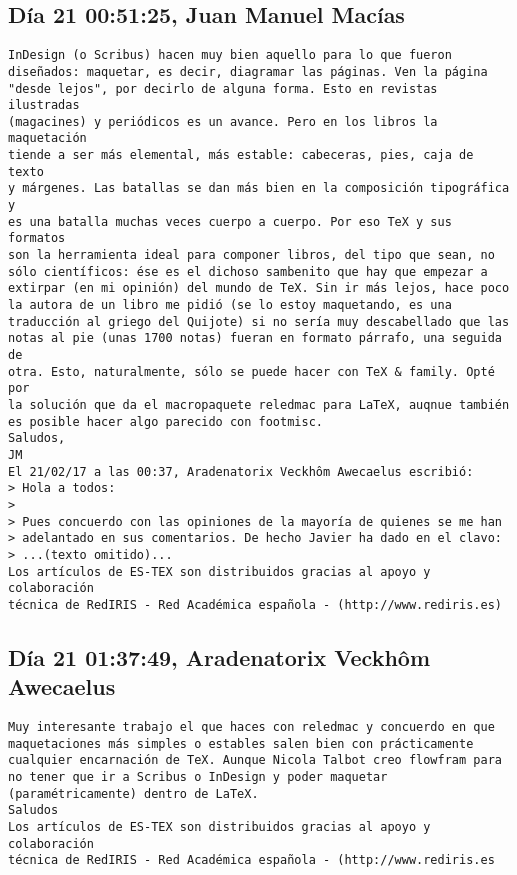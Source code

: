 \documentclass[a4paper,10pt]{article}
\begin{document}
\subsection{Día 21 00:51:25, Juan Manuel Macías}

\begin{lstlisting}
InDesign (o Scribus) hacen muy bien aquello para lo que fueron 
diseñados: maquetar, es decir, diagramar las páginas. Ven la página 
"desde lejos", por decirlo de alguna forma. Esto en revistas ilustradas 
(magacines) y periódicos es un avance. Pero en los libros la maquetación 
tiende a ser más elemental, más estable: cabeceras, pies, caja de texto 
y márgenes. Las batallas se dan más bien en la composición tipográfica y 
es una batalla muchas veces cuerpo a cuerpo. Por eso TeX y sus formatos 
son la herramienta ideal para componer libros, del tipo que sean, no 
sólo científicos: ése es el dichoso sambenito que hay que empezar a 
extirpar (en mi opinión) del mundo de TeX. Sin ir más lejos, hace poco 
la autora de un libro me pidió (se lo estoy maquetando, es una 
traducción al griego del Quijote) si no sería muy descabellado que las 
notas al pie (unas 1700 notas) fueran en formato párrafo, una seguida de 
otra. Esto, naturalmente, sólo se puede hacer con TeX & family. Opté por 
la solución que da el macropaquete reledmac para LaTeX, auqnue también 
es posible hacer algo parecido con footmisc.
Saludos,
JM
El 21/02/17 a las 00:37, Aradenatorix Veckhôm Awecaelus escribió:
> Hola a todos:
>
> Pues concuerdo con las opiniones de la mayoría de quienes se me han
> adelantado en sus comentarios. De hecho Javier ha dado en el clavo:
> ...(texto omitido)...
Los artículos de ES-TEX son distribuidos gracias al apoyo y colaboración 
técnica de RedIRIS - Red Académica española - (http://www.rediris.es)

\end{lstlisting}

\subsection{Día 21 01:37:49, Aradenatorix Veckhôm Awecaelus}

\begin{lstlisting}
Muy interesante trabajo el que haces con reledmac y concuerdo en que
maquetaciones más simples o estables salen bien con prácticamente
cualquier encarnación de TeX. Aunque Nicola Talbot creo flowfram para
no tener que ir a Scribus o InDesign y poder maquetar
(paramétricamente) dentro de LaTeX.
Saludos
Los artículos de ES-TEX son distribuidos gracias al apoyo y colaboración 
técnica de RedIRIS - Red Académica española - (http://www.rediris.es

\end{lstlisting}
\end{document}
